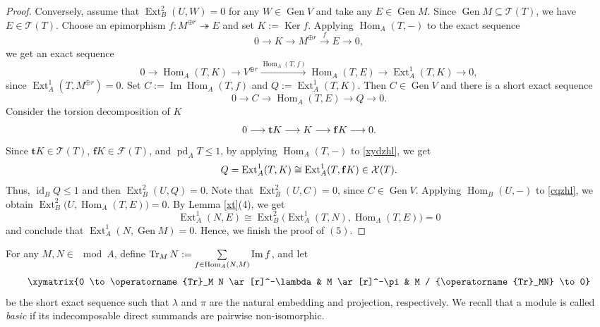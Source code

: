 \documentclass[reqno,12pt]{amsart}
\numberwithin{equation}{section}
\theoremstyle{plain}
\theoremstyle{definition}
\begin{document}
\begin{proof}
Conversely, assume that
$\operatorname{Ext}_B^2(U,W)=0$ for any
$W\in\operatorname{Gen}V$ and take any
$E\in\operatorname{Gen}M$. Since
$\operatorname{Gen}M\subseteq\mathcal{T}(T)$, we have
$E\in\mathcal{T}(T)$. Choose an epimorphism
$f:M^{\oplus r}\twoheadrightarrow E$ and set $K:=\operatorname{Ker}f$. Applying
$\operatorname{Hom}_A(T,-)$ to the exact sequence
\[
0\longrightarrow K\longrightarrow M^{\oplus r}
\xrightarrow{\,f\,}E\longrightarrow0,
\]
we get an exact sequence
\[
0\longrightarrow\operatorname{Hom}_A(T,K)
\longrightarrow V^{\oplus r}
\xrightarrow{\operatorname{Hom}_A(T,f)}
\operatorname{Hom}_A(T,E)
\longrightarrow\operatorname{Ext}_A^1(T,K)
\longrightarrow0,
\]
since $\operatorname{Ext}_A^1(T,M^{\oplus r})=0$. Set
$C:=\operatorname{Im}\operatorname{Hom}_A(T,f)$ and
$Q:=\operatorname{Ext}_A^1(T,K)$. Then $C\in\operatorname{Gen}V$ and there is a short exact sequence
\begin{equation}\label{cqzhl}
0\longrightarrow C
\longrightarrow\operatorname{Hom}_A(T,E)
\longrightarrow Q
\longrightarrow0.\end{equation}
Consider the torsion decomposition of $K$
\begin{equation}\label{xydzhl}
0\longrightarrow{\bf t}K
\longrightarrow K
\longrightarrow{\bf f}K
\longrightarrow0.
\end{equation}
Since $\mathbf{t}K\in\mathcal{T}(T)$,
$\mathbf{f}K\in\mathcal{F}(T)$, and $\operatorname{pd}_A T\leq1$,
by applying $\operatorname{Hom}_A(T,-)$ to \eqref{xydzhl}, we get
\[
Q=\operatorname{Ext}_A^1(T,K)
\cong
\operatorname{Ext}_A^1(T,{\bf f}K)
\in\mathcal{X}(T).
\]
Thus, $\operatorname{id}_B Q\leq1$ and then
$\operatorname{Ext}_B^2(U,Q)=0$. Note that $\operatorname{Ext}_B^2(U,C)=0$, since $C\in\operatorname{Gen}V$. Applying
$\operatorname{Hom}_B(U,-)$ to \eqref{cqzhl},
we obtain
\(\operatorname{Ext}_B^2
 \bigl(U,\operatorname{Hom}_A(T,E)\bigr)=0\).
By Lemma \ref{xt}(4), we get
\[
\operatorname{Ext}_A^1(N,E)
\cong
\operatorname{Ext}_B^2
 \bigl(\operatorname{Ext}_A^1(T,N),
       \operatorname{Hom}_A(T,E)\bigr)
=0
\]
and conclude that
$\operatorname{Ext}_A^1(N,\operatorname{Gen}M)=0$. Hence, we finish the proof of $(5)$.
\end{proof}

For any $M,N\in\mod A$, define
\(\operatorname{Tr}_MN :=
\sum\limits_{f\in{\rm Hom}_A(N,M)}\operatorname{Im}f\), and let
\begin{equation}\label{star2}
\xymatrix{0 \to \operatorname{Tr}_M N \ar[r]^-\lambda& M \ar[r]^-\pi& M / {\operatorname{Tr}_MN} \to 0}
\end{equation}
be the short exact sequence such that $\lambda$ and $\pi$ are the natural embedding and projection, respectively. We recall that a module is called {\em basic} if its indecomposable direct summands are pairwise non-isomorphic.
\end{document}
